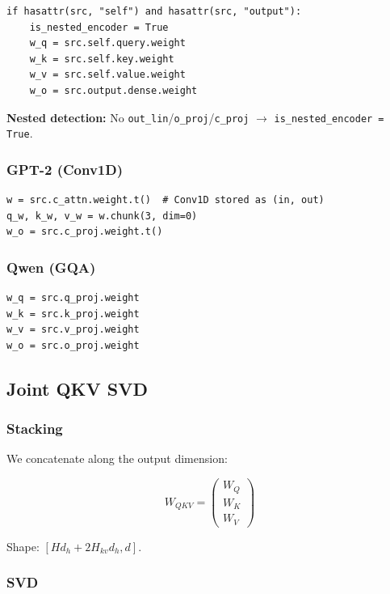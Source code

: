 \begin{lstlisting}
if hasattr(src, "self") and hasattr(src, "output"):
    is_nested_encoder = True
    w_q = src.self.query.weight
    w_k = src.self.key.weight
    w_v = src.self.value.weight
    w_o = src.output.dense.weight
\end{lstlisting}

\textbf{Nested detection:} No \texttt{out\_lin}/\texttt{o\_proj}/\texttt{c\_proj} $\to$ \texttt{is\_nested\_encoder = True}.

\subsubsection{GPT-2 (Conv1D)}

\begin{lstlisting}
w = src.c_attn.weight.t()  # Conv1D stored as (in, out)
q_w, k_w, v_w = w.chunk(3, dim=0)
w_o = src.c_proj.weight.t()
\end{lstlisting}

\subsubsection{Qwen (GQA)}

\begin{lstlisting}
w_q = src.q_proj.weight
w_k = src.k_proj.weight
w_v = src.v_proj.weight
w_o = src.o_proj.weight
\end{lstlisting}

\subsection{Joint QKV SVD}

\subsubsection{Stacking}

We concatenate along the output dimension:

\[
W_{QKV} = \begin{pmatrix} W_Q \\ W_K \\ W_V \end{pmatrix}
\]

Shape: $[H d_h + 2 H_{kv} d_h, d]$.

\subsubsection{SVD}

